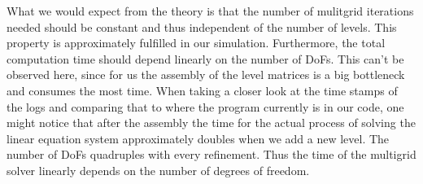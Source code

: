 \documentclass[letterpaper,10pt,english, openany]{sphinxmanual}
\begin{document}
What we would expect from the theory is that the number of mulitgrid iterations needed should be constant and thus independent of the number of levels. This property is approximately fulfilled in our simulation. Furthermore, the total computation time should depend linearly on the number of DoFs. This can’t be observed here, since for us the assembly of the level matrices is a big bottleneck and consumes the most time. When taking a closer look at the time stamps of the logs and comparing that
to where the program currently is in our code, one might notice that after the assembly the time for the actual process of solving the linear equation system approximately doubles when we add a new level. The number of DoFs quadruples with every refinement. Thus the time of the multigrid solver linearly depends on the number of degrees of freedom.

{
\begin{sphinxVerbatim}[commandchars=\\\{\}]
\llap{\color{nbsphinxin}[3]:\,\hspace{\fboxrule}\hspace{\fboxsep}}
\end{sphinxVerbatim}
}
\end{document}
